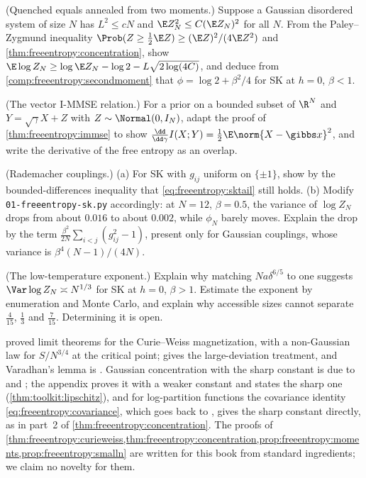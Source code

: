 \begin{refsection}
\begin{exercises}
\item \translate\hard (Quenched equals annealed from two moments.) Suppose a Gaussian disordered system of size $N$ has $L^2\le cN$ and $\E Z_N^2\le C(\E Z_N)^2$ for all $N$. From the Paley--Zygmund inequality $\Prob(Z\ge\frac12\E Z)\ge(\E Z)^2/(4\E Z^2)$ and \cref{thm:freeentropy:concentration}, show $\E\log Z_N\ge\log\E Z_N-\log2-L\sqrt{2\log(4C)}$, and deduce from \cref{comp:freeentropy:secondmoment} that $\phi=\log2+\beta^2/4$ for SK at $h=0$, $\beta<1$. \label{ex:freeentropy:secondmoment}

\item \translate (The vector I-MMSE relation.) For a prior on a bounded subset of $\R^N$ and $Y=\sqrt\gamma X+Z$ with $Z\sim\Normal(0,I_N)$, adapt the proof of \cref{thm:freeentropy:immse} to show $\frac{\dd}{\dd\gamma}I(X;Y)=\frac12\E\norm{X-\gibbs x}^2$, and write the derivative of the free entropy as an overlap.\label{ex:freeentropy:vector}

\item \measurement (Rademacher couplings.) (a) For SK with $g_{ij}$ uniform on $\{\pm1\}$, show by the bounded-differences inequality that \eqref{eq:freeentropy:sktail} still holds. (b) Modify \texttt{01-freeentropy-sk.py} accordingly: at $N=12$, $\beta=0.5$, the variance of $\log Z_N$ drops from about $0.016$ to about $0.002$, while $\phi_N$ barely moves. Explain the drop by the term $\frac{\beta^2}{2N}\sum_{i<j}(g_{ij}^2-1)$, present only for Gaussian couplings, whose variance is $\beta^4(N-1)/(4N)$.\label{ex:freeentropy:rademacher}

\item \research (The low-temperature exponent.) Explain why matching $Na\delta^{6/5}$ to one suggests $\Var\log Z_N\asymp N^{1/3}$ for SK at $h=0$, $\beta>1$. Estimate the exponent by enumeration and Monte Carlo, and explain why accessible sizes cannot separate $\frac4{15}$, $\frac13$ and $\frac7{15}$. Determining it is open.\label{ex:freeentropy:exponent}
\end{exercises}

\notesandrefs
\Textcite{EllisNewman1978} proved limit theorems for the Curie--Weiss magnetization, with a non-Gaussian law for $S/N^{3/4}$ at the critical point; \textcite{Ellis1985} gives the large-deviation treatment, and Varadhan's lemma is \textcite{Varadhan1966}. Gaussian concentration with the sharp constant is due to \textcite{TsirelsonIbragimovSudakov1976} and \textcite{Borell1975}; the appendix proves it with a weaker constant and states the sharp one (\cref{thm:toolkit:lipschitz}), and for log-partition functions the covariance identity \eqref{eq:freeentropy:covariance}, which goes back to \textcite{HoudrePerezAbreu1995}, gives the sharp constant directly, as in part~2 of \cref{thm:freeentropy:concentration}. The proofs of \cref{thm:freeentropy:curieweiss,thm:freeentropy:concentration,prop:freeentropy:moments,prop:freeentropy:smalln} are written for this book from standard ingredients; we claim no novelty for them.


\end{refsection}
